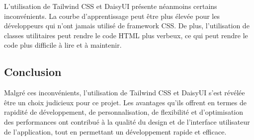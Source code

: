 L'utilisation de Tailwind CSS et DaisyUI présente néanmoins certains inconvénients. La courbe d'apprentissage peut être plus élevée pour les développeurs qui n'ont jamais utilisé de framework CSS. De plus, l'utilisation de classes utilitaires peut rendre le code HTML plus verbeux, ce qui peut rendre le code plus difficile à lire et à maintenir.

\subsection{Conclusion}

Malgré ces inconvénients, l'utilisation de Tailwind CSS et DaisyUI s'est révélée être un choix judicieux pour ce projet. Les avantages qu'ils offrent en termes de rapidité de développement, de personnalisation, de flexibilité et d'optimisation des performances ont contribué à la qualité du design et de l'interface utilisateur de l'application, tout en permettant un développement rapide et efficace.